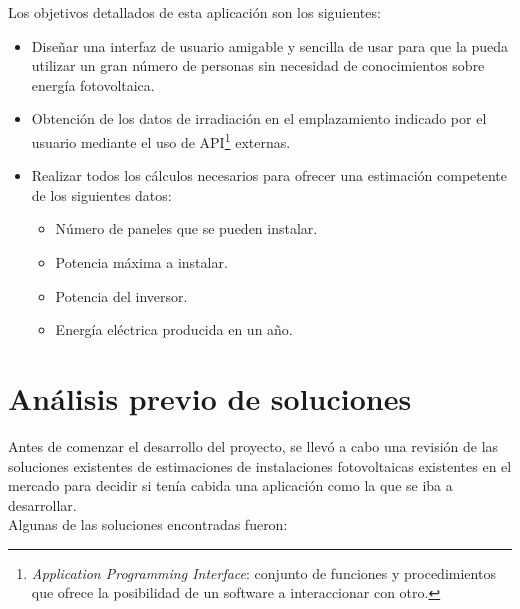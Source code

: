 Los objetivos detallados de esta aplicación son los siguientes:
\begin{itemize}
\item Diseñar una interfaz de usuario amigable y sencilla de usar para que la pueda utilizar un gran número de personas sin necesidad de conocimientos sobre energía fotovoltaica.

\item Obtención de los datos de irradiación en el emplazamiento indicado por el usuario mediante el uso de API\footnote{\textit{Application Programming Interface}: conjunto de funciones y procedimientos que ofrece la posibilidad de un software a interaccionar con otro.} externas.
\item Realizar todos los cálculos necesarios para ofrecer una estimación competente de los siguientes datos:

\begin{itemize}

\item Número de paneles que se pueden instalar.
\item Potencia máxima a instalar.
\item Potencia del inversor.
\item Energía eléctrica producida en un año.

\end{itemize}
\end{itemize}

\section{Análisis previo de soluciones}\label{intro_solutions}

Antes de comenzar el desarrollo del proyecto, se llevó a cabo una revisión de las soluciones existentes de estimaciones de instalaciones fotovoltaicas existentes en el mercado para decidir si tenía cabida una aplicación como la que se iba a desarrollar.\\

Algunas de las soluciones encontradas fueron:

